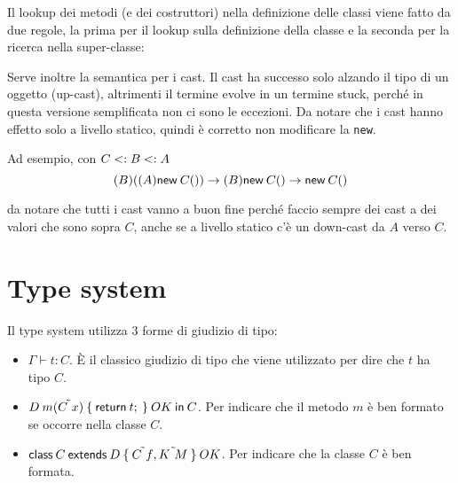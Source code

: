 \noindent Il lookup dei metodi (e dei costruttori) nella definizione delle classi viene fatto da due regole, la prima per il lookup sulla definizione della classe e la seconda per la ricerca nella super-classe:

\begin{prooftree}
\end{prooftree}

\begin{prooftree}
\end{prooftree}

\noindent Serve inoltre la semantica per i cast. Il cast ha successo solo alzando il tipo di un oggetto (up-cast), altrimenti il termine evolve in un termine stuck, perché in questa versione semplificata non ci sono le eccezioni. Da notare che i cast hanno effetto solo a livello statico, quindi è corretto non modificare la \texttt{new}.

\begin{center}
\begin{bprooftree}
\end{bprooftree}
\begin{bprooftree}
\end{bprooftree}
\end{center}

\noindent Ad esempio, con $C \stype B \stype A$
$$
(B)((A) \new{C}{}) \to (B) \new{C}{} \to \new{C}{}
$$

\noindent da notare che tutti i cast vanno a buon fine perché faccio sempre dei cast a dei valori che sono sopra $C$, anche se a livello statico c'è un down-cast da $A$ verso $C$.

\section{Type system}

Il type system utilizza 3 forme di giudizio di tipo:

\begin{itemize}
	\item $\Gamma \vdash t : C$. \`E il classico giudizio di tipo che viene utilizzato per dire che $t$ ha tipo $C$.
	\item $\method{D}{m}{\tilde{C\ x}}{t} \: OK \: \IN{C}$. Per indicare che il metodo $m$ è ben formato se occorre nella classe $C$.
	\item $ \class{C}{D}{\tilde{C\ f}, \tilde{K \ M}} \: OK$. Per indicare che la classe $C$ è ben formata.
\end{itemize}

